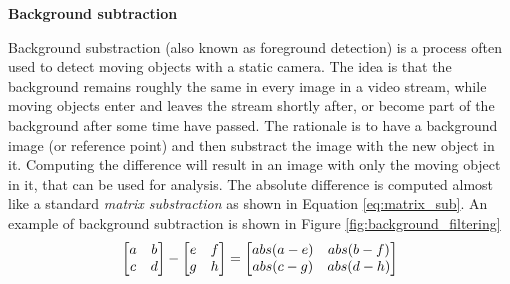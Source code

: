 \noindent \textbf{Background subtraction} \par
Background substraction (also known as foreground detection) is a process often used to detect moving objects with a static camera. The idea is that the background remains roughly the same in every image in a video stream, while moving objects enter and leaves the stream shortly after, or become part of the background after some time have passed. The rationale is to have a background image (or reference point) and then substract the image with the new object in it. Computing the difference will result in an image with only the moving object in it, that can be used for analysis. The absolute difference is computed almost like a standard \textit{matrix substraction} as shown in Equation \ref{eq:matrix_sub}. An example of background subtraction is shown in Figure \ref{fig:background_filtering}\\

\begin{equation}
\setlength{\arraycolsep}{5pt}
 \begin{bmatrix}
  a & b \\
  c & d \\
 \end{bmatrix} - 
 \setlength{\arraycolsep}{5pt} 
 \begin{bmatrix}
  e & f \\
  g & h \\
 \end{bmatrix} =
 \setlength{\arraycolsep}{5pt} 
 \begin{bmatrix}
  abs(a-e) & abs(b-f) \\
  abs(c-g) & abs(d-h) \\
 \end{bmatrix}
 \label{eq:matrix_sub}
\end{equation}

